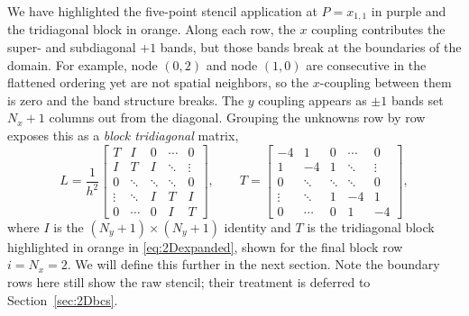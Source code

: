 We have highlighted the five-point stencil application at $P = x_{1,1}$ in purple and the tridiagonal block in orange. Along each row, the $x$ coupling contributes the super- and subdiagonal
$+1$ bands, but those bands break at the boundaries of the domain. For example, node
$(0,2)$ and node $(1,0)$ are consecutive in the flattened ordering yet are not spatial
neighbors, so the $x$-coupling between them is zero and the band structure breaks. The $y$ coupling
appears as $\pm1$ bands set $N_x+1$ columns out from the diagonal. Grouping
the unknowns row by row exposes this as a \emph{block tridiagonal} matrix,
\begin{equation}
    L = \frac{1}{h^2}
    \begin{bmatrix}
        T & I & 0 & \cdots & 0 \\
        I & T & I & \ddots & \vdots \\
        0 & \ddots & \ddots & \ddots & 0 \\
        \vdots & \ddots & I & T & I \\
        0 & \cdots & 0 & I & T
    \end{bmatrix},
    \qquad
    T =
    \begin{bmatrix}
        -4 & 1 & 0 & \cdots & 0 \\
         1 & -4 & 1 & \ddots & \vdots \\
         0 & \ddots & \ddots & \ddots & 0 \\
         \vdots & \ddots & 1 & -4 & 1 \\
         0 & \cdots & 0 & 1 & -4
    \end{bmatrix},
    \label{eq:2Dblock}
\end{equation}
where $I$ is the $(N_y+1)\times(N_y+1)$ identity and $T$ is the tridiagonal block highlighted in orange in \eqref{eq:2Dexpanded}, shown for the final block row $i=N_x=2$. We will define this further in the next section. Note the boundary
rows here still show the raw stencil; their treatment is deferred to
Section~\ref{sec:2Dbcs}.





